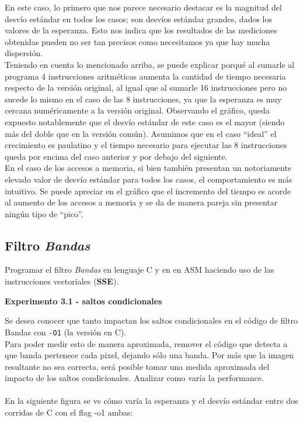 En este caso, lo primero que nos parece necesario destacar es la magnitud del desv\'io est\'andar en todos los casos; son desv\'ios est\'andar grandes, dados los valores de la esperanza. Esto nos indica que los resultados de las mediciones obtenidas pueden no ser tan precisos como necesitamos ya que hay mucha dispersi\'on.\\

Teniendo en cuenta lo mencionado arriba, se puede explicar porqu\'e al sumarle al programa 4 instrucciones aritm\'eticas aumenta la cantidad de tiempo necesaria respecto de la versi\'on original, al igual que al sumarle 16 instrucciones pero no sucede lo mismo en el caso de las 8 instrucciones, ya que la esperanza es muy cercana num\'ericamente a la versi\'on original. Observando el gr\'afico, queda expuesto notablemente que el desv\'io est\'andar de este caso es el mayor (siendo m\'as del doble que en la versi\'on com\'un). Asumimos que en el caso ``ideal'' el crecimiento es paulatino y el tiempo necesario para ejecutar las 8 instrucciones queda por encima del caso anterior y por debajo del siguiente.\\

En el caso de los accesos a memoria, si bien tambi\'en presentan un notoriamente elevado valor de desv\'io est\'andar para todos los casos, el comportamiento es m\'as intuitivo. Se puede apreciar en el gr\'afico que el incremento del tiempo es acorde al aumento de los accesos a memoria y se da de manera pareja sin presentar ning\'un tipo de ``pico''.


\newpage

\subsection{Filtro \textit{Bandas}}

Programar el filtro \textit{Bandas} en lenguaje C y en en ASM haciendo uso de 
las instrucciones vectoriales (\textbf{SSE}).

\vspace*{0.3cm} \noindent
\textbf{Experimento 3.1 - saltos condicionales}

Se desea conocer que tanto impactan los saltos condicionales en el código 
de filtro Bandas con \verb|-O1| (la versión en C).\\
Para poder medir esto de manera aproximada, remover el código
que detecta a que banda pertenece cada pixel, dejando
sólo una banda.
Por más que la imagen resultante no sea correcta, será posible tomar una
medida aproximada del impacto de los saltos condicionales.
Analizar como varía la performance. \\
\\
En la siguiente figura se ve c\'omo var\'ia la esperanza y el desv\'io est\'andar entre dos corridas de C con el flag -o1 ambas:

